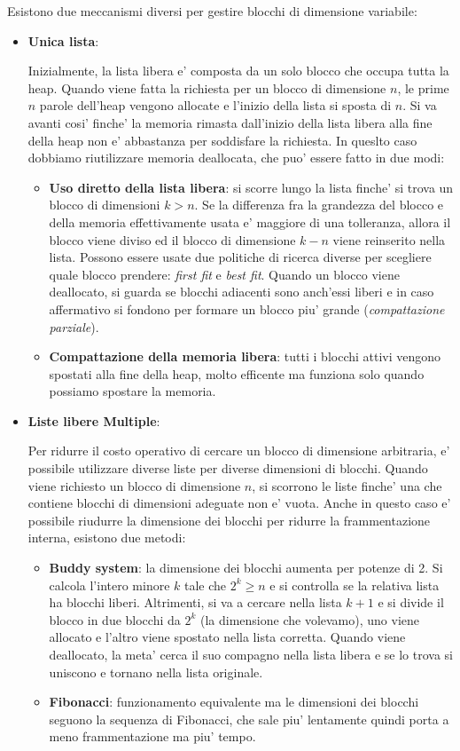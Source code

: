 Esistono due meccanismi diversi per gestire blocchi di dimensione variabile:
\begin{itemize}
\item \textbf{Unica lista}: 

  Inizialmente, la lista libera e' composta da un solo blocco che occupa tutta la heap. Quando viene fatta la richiesta per un blocco di dimensione $ n $, le prime $ n $ parole dell'heap vengono allocate e l'inizio della lista si sposta di $ n $. Si va avanti cosi' finche' la memoria rimasta dall'inizio della lista libera alla fine della heap non e' abbastanza per soddisfare la richiesta. In queslto caso dobbiamo riutilizzare memoria deallocata, che puo' essere fatto in due modi:
    \begin{itemize}
      \item \textbf{Uso diretto della lista libera}: si scorre lungo la lista finche' si trova un blocco di dimensioni $ k > n $. Se la differenza fra la grandezza del blocco e della memoria effettivamente usata e' maggiore di una tolleranza, allora il blocco viene diviso ed il blocco di dimensione $ k - n $ viene reinserito nella lista. Possono essere usate due politiche di ricerca diverse per scegliere quale blocco prendere: \textit{first fit} e \textit{best fit}. Quando un blocco viene deallocato, si guarda se blocchi adiacenti sono anch'essi liberi e in caso affermativo si fondono per formare un blocco piu' grande (\textit{compattazione parziale}).
      \item \textbf{Compattazione della memoria libera}: tutti i blocchi attivi vengono spostati alla fine della heap, molto efficente ma funziona solo quando possiamo spostare la memoria.
    \end{itemize}
  \item \textbf{Liste libere Multiple}:

    Per ridurre il costo operativo di cercare un blocco di dimensione arbitraria, e' possibile utilizzare diverse liste per diverse dimensioni di blocchi. Quando viene richiesto un blocco di dimensione $ n $, si scorrono le liste finche' una che contiene blocchi di dimensioni adeguate non e' vuota. Anche in questo caso e' possibile riudurre la dimensione dei blocchi per ridurre la frammentazione interna, esistono due metodi:
    \begin{itemize}
      \item \textbf{Buddy system}: la dimensione dei blocchi aumenta per potenze di 2. Si calcola l'intero minore $ k $ tale che $ 2^k \geq n $ e si controlla se la relativa lista ha blocchi liberi. Altrimenti, si va a cercare nella lista $ k+1 $ e si divide il blocco in due blocchi da $ 2^k $ (la dimensione che volevamo), uno viene allocato e l'altro viene spostato nella lista corretta. Quando viene deallocato, la meta' cerca il suo compagno nella lista libera e se lo trova si uniscono e tornano nella lista originale.
      \item \textbf{Fibonacci}: funzionamento equivalente ma le dimensioni dei blocchi seguono la sequenza di Fibonacci, che sale piu' lentamente quindi porta a meno frammentazione ma piu' tempo.
    \end{itemize}
\end{itemize}

